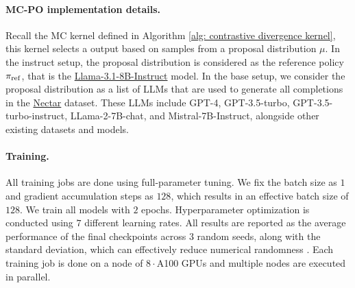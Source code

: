 \paragraph{MC-PO implementation details.}
Recall the MC kernel defined in Algorithm \ref{alg: contrastive divergence kernel},
this kernel selects a output based on samples from a proposal distribution $\mu$.
In the instruct setup,
the proposal distribution is considered as the reference policy $\pi_{\rm ref}$,
that is the \href{https://huggingface.co/meta-llama/Llama-3.1-8B-Instruct}{Llama-3.1-8B-Instruct} model.
In the base setup,
we consider the proposal distribution as a list of LLMs that are used to generate all completions in the \href{https://huggingface.co/datasets/berkeley-nest/Nectar}{Nectar} dataset.
These LLMs include GPT-4, GPT-3.5-turbo, GPT-3.5-turbo-instruct, LLama-2-7B-chat, and Mistral-7B-Instruct, alongside other existing datasets and models.



\paragraph{Training.}
All training jobs are done using full-parameter tuning. 
We fix the batch size as $1$ and gradient accumulation steps as $128$,
which results in an effective batch size of $128$.
We train all models with $2$ epochs.
Hyperparameter optimization is conducted using $7$ different learning rates.
All results are reported as the average performance of the final checkpoints across $3$ random seeds, along with the standard deviation,
which can effectively reduce numerical randomness \citep{miller2024adding}.
Each training job is done on a node of $8\cdot$A100 GPUs and multiple nodes are executed in parallel.






